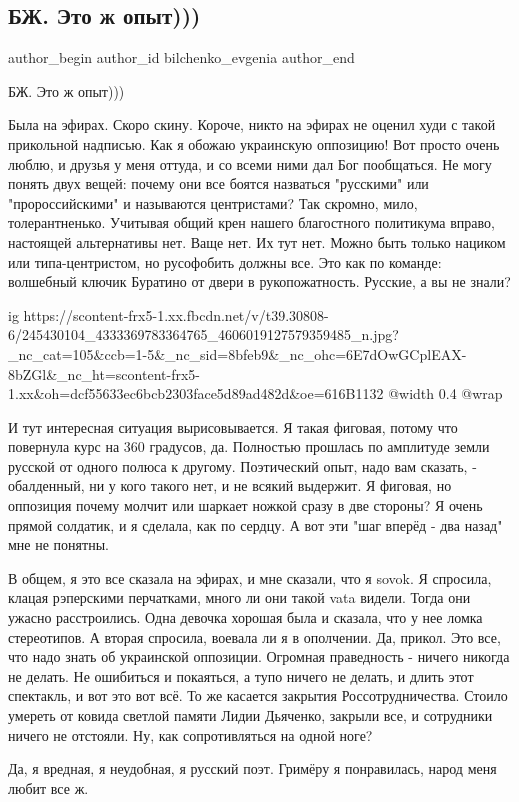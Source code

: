  
 
 
 
 
 
\subsection{БЖ. Это ж опыт)))}
\label{sec:11_10_2021.fb.bilchenko_evgenia.1.opyt}
 
\ifcmt
 author_begin
   author_id bilchenko_evgenia
 author_end
\fi

БЖ. Это ж опыт)))

Была на эфирах. Скоро скину. Короче, никто на эфирах не оценил худи с такой
прикольной надписью. Как я обожаю украинскую оппозицию! Вот просто очень люблю,
и друзья у меня оттуда, и со всеми ними дал Бог пообщаться. Не могу понять двух
вещей: почему они все боятся назваться "русскими" или "пророссийскими" и
называются центристами? Так скромно, мило, толерантненько. Учитывая общий крен
нашего благостного политикума вправо, настоящей альтернативы нет. Ваще нет. Их
тут нет. Можно быть только нациком или типа-центристом, но русофобить должны
все. Это как по команде: волшебный ключик Буратино от двери в рукопожатность.
Русские, а вы не знали?

\ifcmt
  ig https://scontent-frx5-1.xx.fbcdn.net/v/t39.30808-6/245430104_4333369783364765_4606019127579359485_n.jpg?_nc_cat=105&ccb=1-5&_nc_sid=8bfeb9&_nc_ohc=6E7dOwGCplEAX-8bZGl&_nc_ht=scontent-frx5-1.xx&oh=dcf55633ec6bcb2303face5d89ad482d&oe=616B1132
  @width 0.4
  @wrap 
\fi

И тут интересная ситуация вырисовывается. Я такая фиговая, потому что повернула
курс на 360 градусов, да. Полностью прошлась по амплитуде земли русской от
одного полюса к другому. Поэтический опыт, надо вам сказать, - обалденный, ни у
кого такого нет, и не всякий выдержит. Я фиговая, но оппозиция почему молчит
или шаркает ножкой сразу в две стороны? Я очень прямой солдатик, и я сделала,
как по сердцу. А вот эти "шаг вперёд - два назад" мне не понятны.

В общем, я это все сказала на эфирах, и мне сказали, что я sovok. Я спросила,
клацая рэперскими перчатками, много ли они такой vata видели. Тогда они ужасно
расстроились. Одна девочка хорошая была и сказала, что у нее ломка стереотипов.
А вторая спросила, воевала ли я в ополчении. Да, прикол. Это все, что надо
знать об украинской оппозиции. Огромная праведность - ничего никогда не делать.
Не ошибиться и покаяться, а тупо ничего не делать, и длить этот спектакль, и
вот это вот всё. То же касается закрытия Россотрудничества. Стоило умереть от
ковида светлой памяти Лидии Дьяченко, закрыли все, и сотрудники ничего не
отстояли. Ну, как сопротивляться на одной ноге?

Да, я вредная, я неудобная, я русский поэт. Гримёру я понравилась, народ меня
любит все ж.

